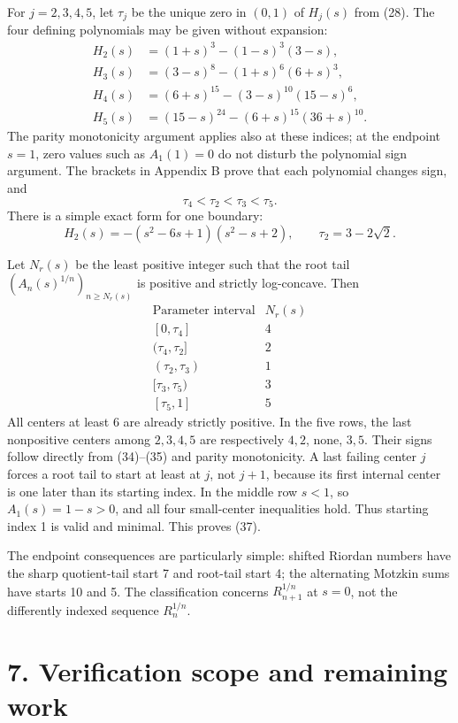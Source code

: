 \documentclass[
  11pt,
  a4paper,
]{article}
\begin{document}
For \(j=2,3,4,5\), let \(\tau_j\) be the unique zero in \((0,1)\) of
\(H_j(s)\) from (28). The four defining polynomials may be given without
expansion: \[
\begin{aligned}
H_2(s)&=(1+s)^3-(1-s)^3(3-s),\\
H_3(s)&=(3-s)^8-(1+s)^6(6+s)^3,\\
H_4(s)&=(6+s)^{15}-(3-s)^{10}(15-s)^6,\\
H_5(s)&=(15-s)^{24}-(6+s)^{15}(36+s)^{10}.
\end{aligned}
\tag{34}
\] The parity monotonicity argument applies also at these indices; at
the endpoint \(s=1\), zero values such as \(A_1(1)=0\) do not disturb
the polynomial sign argument. The brackets in Appendix B prove that each
polynomial changes sign, and \[
\tau_4<\tau_2<\tau_3<\tau_5.
\tag{35}
\] There is a simple exact form for one boundary: \[
H_2(s)=-(s^2-6s+1)(s^2-s+2),\qquad \tau_2=3-2\sqrt2.
\tag{36}
\]

Let \(N_r(s)\) be the least positive integer such that the root tail
\((A_n(s)^{1/n})_{n\ge N_r(s)}\) is positive and strictly log-concave.
Then \[
\begin{array}{c|c}
\text{Parameter interval}&N_r(s)\\\hline
{[0,\tau_4]}&4\\
(\tau_4,\tau_2]&2\\
(\tau_2,\tau_3)&1\\
{[\tau_3,\tau_5)}&3\\
{[\tau_5,1]}&5
\end{array}
\tag{37}
\] All centers at least 6 are already strictly positive. In the five
rows, the last nonpositive centers among \(2,3,4,5\) are respectively
\(4,2\), none, \(3,5\). Their signs follow directly from (34)--(35) and
parity monotonicity. A last failing center \(j\) forces a root tail to
start at least at \(j\), not \(j+1\), because its first internal center
is one later than its starting index. In the middle row \(s<1\), so
\(A_1(s)=1-s>0\), and all four small-center inequalities hold. Thus
starting index 1 is valid and minimal. This proves (37).

The endpoint consequences are particularly simple: shifted Riordan
numbers have the sharp quotient-tail start 7 and root-tail start 4; the
alternating Motzkin sums have starts 10 and 5. The classification
concerns \(R_{n+1}^{1/n}\) at \(s=0\), not the differently indexed
sequence \(R_n^{1/n}\).

\section{7. Verification scope and remaining
work}\label{verification-scope-and-remaining-work}
\end{document}
